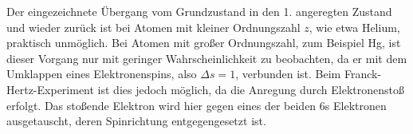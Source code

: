 Der eingezeichnete Übergang vom Grundzustand in den 1. angeregten Zustand und
wieder zurück ist bei Atomen mit kleiner Ordnungszahl $z$, wie etwa Helium,
praktisch unmöglich. Bei Atomen mit großer Ordnungszahl, zum Beispiel Hg, ist
dieser Vorgang nur mit geringer Wahrscheinlichkeit zu beobachten, da er mit dem
Umklappen  eines Elektronenspins, also $\Delta s=1$, verbunden ist. Beim
Franck-Hertz-Experiment ist dies jedoch möglich, da die Anregung durch
Elektronenstoß erfolgt. Das stoßende Elektron wird hier gegen eines der beiden
6s Elektronen ausgetauscht, deren Spinrichtung entgegengesetzt ist.
